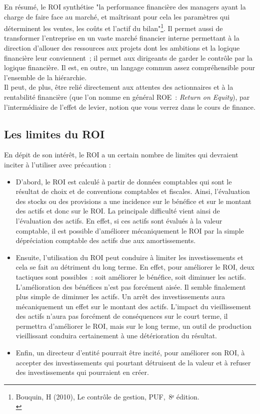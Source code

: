 \documentclass{kaobook}
\begin{document}
En résumé, le ROI synthétise "la performance financière des managers ayant la charge de faire face au marché, et maîtrisant pour cela les paramètres qui déterminent les ventes, les coûts et l'actif du bilan"\footnote{Bouquin, H (2010), Le contrôle de gestion, PUF, 8ᵉ édition.\\}. Il permet aussi de transformer l'entreprise en un vaste marché financier interne permettant à la direction d'allouer des ressources aux projets dont les ambitions et la logique financière leur conviennent ; il permet aux dirigeants de garder le contrôle par la logique financière. Il est, en outre, un langage commun assez compréhensible pour l'ensemble de la hiérarchie.\\

Il peut, de plus, être relié directement aux attentes des actionnaires et à la rentabilité financière (que l'on nomme en général ROE : \emph{Return on Equity}), par l'intermédiaire de l'effet de levier, notion que vous verrez dans le cours de finance.\\
\subsection{Les limites du ROI}
\label{sec:org81367a1}
En dépit de son intérêt, le ROI a un certain nombre de limites qui devraient inciter à l'utiliser avec précaution :\\
\begin{itemize}
\item D'abord, le ROI est calculé à partir de données comptables qui sont le résultat de choix et de conventions comptables et fiscales. Ainsi, l'évaluation des stocks ou des provisions a une incidence sur le bénéfice et sur le montant des actifs et donc sur le ROI. La principale difficulté vient ainsi de l'évaluation des actifs. En effet, si ces actifs sont évalués à la valeur comptable, il est possible d'améliorer mécaniquement le ROI par la simple dépréciation comptable des actifs due aux amortissements.\\
\item Ensuite, l'utilisation du ROI peut conduire à limiter les investissements et cela se fait au détriment du long terme. En effet, pour améliorer le ROI, deux tactiques sont possibles : soit améliorer le bénéfice, soit diminuer les actifs. L'amélioration des bénéfices n'est pas forcément aisée. Il semble finalement plus simple de diminuer les actifs. Un arrêt des investissements aura mécaniquement un effet sur le montant des actifs. L'impact du vieillissement des actifs n'aura pas forcément de conséquences sur le court terme, il permettra d'améliorer le ROI, mais sur le long terme, un outil de production vieillissant conduira certainement à une détérioration du résultat.\\
\item Enfin, un directeur d'entité pourrait être incité, pour améliorer son ROI, à accepter des investissements qui pourtant détruisent de la valeur et à refuser des investissements qui pourraient en créer.\\
\end{itemize}
\end{document}
